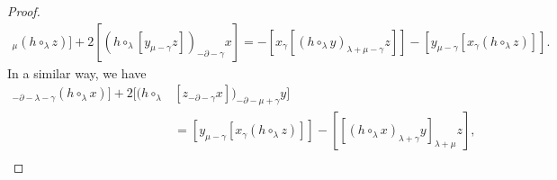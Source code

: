 \documentclass[10pt,a4paper]{amsart}
\begin{document}
\begin{proof}
\begin{align*}
      [[x_{\gamma}y]_{\mu}(h\circ_{\lambda}z)]+2[(h\circ_{\lambda}[y_{\mu-\gamma}z])_{-\partial-\gamma}x]=-[x_{\gamma}[(h\circ_{\lambda}y)_{\lambda+\mu-\gamma}z]]-[y_{\mu-\gamma}[x_{\gamma}(h\circ_{\lambda}z)]].
   \end{align*}
In a similar way, we have
   \begin{align*}
      [[y_{\mu-\gamma}z]_{-\partial-\lambda-\gamma}(h\circ_{\lambda}x)]+2[(h\circ_{\lambda}&[z_{-\partial-\gamma}x])_{-\partial-\mu+\gamma}y] \nonumber\\
      &=[y_{\mu-\gamma}[x_{\gamma}(h\circ_{\lambda}z)]]-[[(h\circ_{\lambda}x)_{\lambda+\gamma}y]_{\lambda+\mu}z],\\

\end{align*}
\end{proof}
\end{document}
